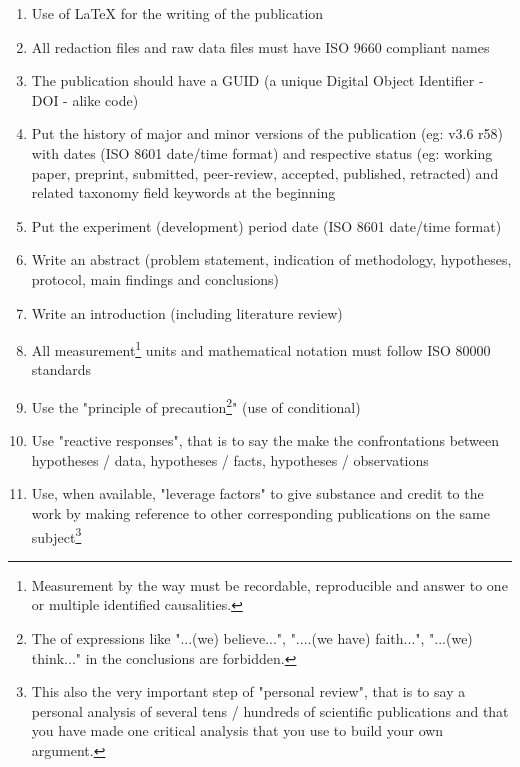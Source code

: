 	\begin{enumerate}[label=\protect\circledbullet{\arabic*},leftmargin=15mm]
		\item Use of \LaTeX{} for the writing of the publication
		
		\item All redaction files and raw data files must have ISO 9660 compliant names
		
		\item The publication should have a GUID (a unique Digital Object Identifier - DOI - alike code)
		
		\item Put the history of major and minor versions of the publication (eg: v3.6 r58) with dates (ISO 8601 date/time format) and respective status (eg: working paper, preprint, submitted, peer-review, accepted, published, retracted) and related taxonomy field keywords at the beginning
		
		\item Put the experiment (development) period date (ISO 8601 date/time format)
		
		\item Write an abstract (problem statement, indication of methodology, hypotheses, protocol, main findings and conclusions)
		
		\item Write an introduction (including literature review)

		\item All measurement\footnote{Measurement by the way must be recordable, reproducible and answer to one or multiple identified causalities.} units and mathematical notation must follow ISO 80000 standards 
		
		\item Use the "principle of precaution\footnote{The of expressions like "...(we) believe...", "....(we have) faith...", "...(we) think..." in the conclusions are forbidden.}" (use of conditional)
		
		\item Use "reactive responses", that is to say the make the confrontations between hypotheses / data, hypotheses / facts, hypotheses / observations 
		
		\item Use, when available, "leverage factors" to give substance and credit to the work by making reference to other corresponding publications on the same subject\footnote{This also the very important step of "personal review", that is to say a personal analysis of several tens / hundreds of scientific publications and that you have made one critical analysis that you use to build your own argument.}
		

\end{enumerate}

